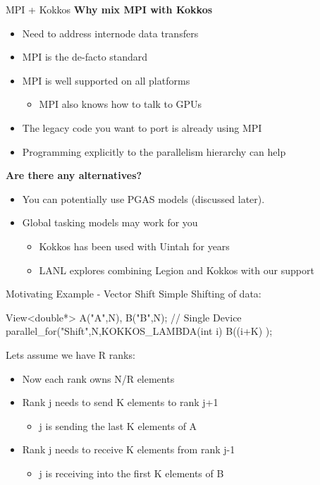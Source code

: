\begin{frame}[fragile]{MPI + Kokkos}
\textbf{Why mix MPI with Kokkos}
\begin{itemize}
  \item Need to address internode data transfers
  \item MPI is the de-facto standard
  \item MPI is well supported on all platforms
  \begin{itemize}
     \item MPI also knows how to talk to GPUs
  \end{itemize}
  \item The legacy code you want to port is already using MPI
  \item Programming explicitly to the parallelism hierarchy can help
\end{itemize}

\pause
\textbf{Are there any alternatives?}
\begin{itemize}
  \item You can potentially use PGAS models (discussed later).
  \item Global tasking models may work for you
  \begin{itemize}
    \item Kokkos has been used with Uintah for years
    \item LANL explores combining Legion and Kokkos with our support
  \end{itemize}
\end{itemize}
\end{frame}

\begin{frame}[fragile]{Motivating Example - Vector Shift}
  Simple Shifting of data:

  \begin{code}[keywords={View,double,int}]
  View<double*> A("A",N), B("B",N);
  // Single Device
  parallel_for("Shift",N,KOKKOS_LAMBDA(int i) {
    B((i+K)%
  });
  \end{code}

\pause
  Lets assume we have R ranks:
  \begin{itemize}
    \item Now each rank owns N/R elements
    \item Rank j needs to send K elements to rank j+1
      \begin{itemize}
         \item j is sending the last K elements of A
      \end{itemize}
    \item Rank j needs to receive K elements from rank j-1
      \begin{itemize}
         \item j is receiving into the first K elements of B
      \end{itemize}
  \end{itemize}
\end{frame}

